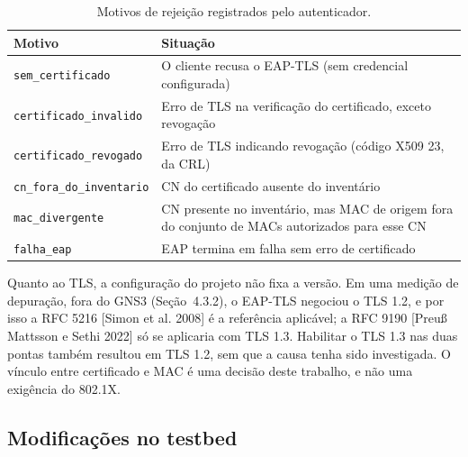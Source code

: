 \documentclass[12pt]{article}
\newcommand{\cit}[2]{[#1]\nocite{#2}}
\begin{document}
\begin{table}[!t]
\centering
\caption{Motivos de rejeição registrados pelo autenticador.}\label{tab:12}
\footnotesize
\renewcommand{\arraystretch}{1.25}
\begin{tabularx}{\linewidth}{|>{\hsize=0.512\hsize\raggedright\arraybackslash}X|>{\hsize=1.488\hsize\raggedright\arraybackslash}X|}
\hline
\textbf{Motivo} & \textbf{Situação} \\ \hline
\texttt{sem\_\allowbreak{}certificado} & O cliente recusa o EAP-TLS (sem credencial configurada) \\ \hline
\texttt{certificado\_\allowbreak{}invalido} & Erro de TLS na verificação do certificado, exceto revogação \\ \hline
\texttt{certificado\_\allowbreak{}revogado} & Erro de TLS indicando revogação (código X509 23, da CRL) \\ \hline
\texttt{cn\_\allowbreak{}fora\_\allowbreak{}do\_\allowbreak{}inventario} & CN do certificado ausente do inventário \\ \hline
\texttt{mac\_\allowbreak{}divergente} & CN presente no inventário, mas MAC de origem fora do conjunto de MACs autorizados para esse CN \\ \hline
\texttt{falha\_\allowbreak{}eap} & EAP termina em falha sem erro de certificado \\ \hline
\end{tabularx}
\end{table}

Quanto ao TLS, a configuração do projeto não fixa a versão. Em uma medição de depuração, fora do GNS3 (Seção~4.3.2), o EAP-TLS negociou o TLS 1.2, e por isso a RFC 5216 \cit{Simon et al. 2008}{rfc5216} é a referência aplicável; a RFC 9190 \cit{Preuß Mattsson e Sethi 2022}{rfc9190} só se aplicaria com TLS 1.3. Habilitar o TLS 1.3 nas duas pontas também resultou em TLS 1.2, sem que a causa tenha sido investigada. O vínculo entre certificado e MAC é uma decisão deste trabalho, e não uma exigência do 802.1X.

\subsection{Modificações no testbed}\label{sec:5.4}
\end{document}
